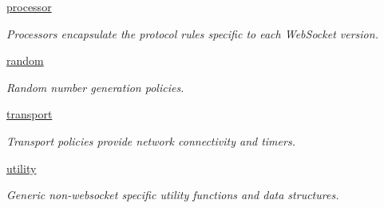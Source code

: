 \begin{DoxyCompactItemize}
 \hyperlink{namespacewebsocketpp_1_1processor}{processor}
\begin{DoxyCompactList}\small\item\em Processors encapsulate the protocol rules specific to each Web\+Socket version. \end{DoxyCompactList}\item 
 \hyperlink{namespacewebsocketpp_1_1random}{random}
\begin{DoxyCompactList}\small\item\em Random number generation policies. \end{DoxyCompactList}\item 
 \hyperlink{namespacewebsocketpp_1_1transport}{transport}
\begin{DoxyCompactList}\small\item\em Transport policies provide network connectivity and timers. \end{DoxyCompactList}\item 
 \hyperlink{namespacewebsocketpp_1_1utility}{utility}
\begin{DoxyCompactList}\small\item\em Generic non-\/websocket specific utility functions and data structures. \end{DoxyCompactList}\end{DoxyCompactItemize}
